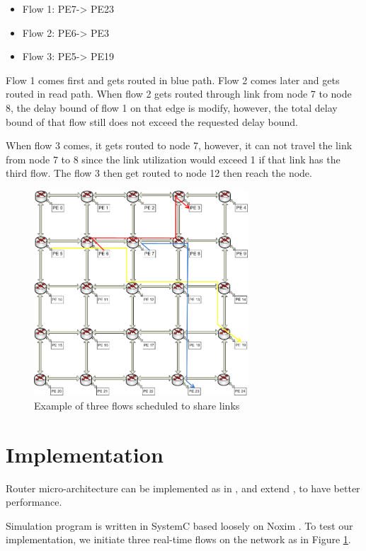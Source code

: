 \documentclass[conference, twocolumn]{IEEEtran}
\theoremstyle{definition}
\begin{document}
\begin{itemize}
  \item Flow 1: PE7-> PE23
  \item Flow 2: PE6-> PE3
  \item Flow 3: PE5-> PE19
\end{itemize}

Flow 1 comes first and gets routed in blue path. Flow 2 comes later and gets
routed in read path.  When flow 2 gets routed through link from node 7 to node
8, the delay bound of flow 1 on that edge is modify, however, the total delay
bound of that flow still does not exceed the requested delay bound.

When flow 3 comes, it gets routed to node 7, however, it can not travel the
link from node 7 to 8 since the link utilization would exceed 1 if that link
has the third flow. The flow 3 then get routed to node 12 then reach the node.

\begin{figure}[htp]
\centering
\includegraphics[width=8cm]{pics/Example.png}
\caption[Three flows example.]
{Example of three flows scheduled to share links}\label{fig:3FlowsEx}
\end{figure}

\section{Implementation}
Router micro-architecture can be implemented as in
\cite{Rexford98arouter},\cite{ZhangService} and extend \cite{PehDelayModel},
\cite{PehSpecPipeR} to have better performance.

Simulation program is written in SystemC based loosely on Noxim \cite{Noxim}.
To test our implementation, we initiate three real-time flows on the network as
in Figure \ref{fig:3FlowsEx}.
\end{document}
